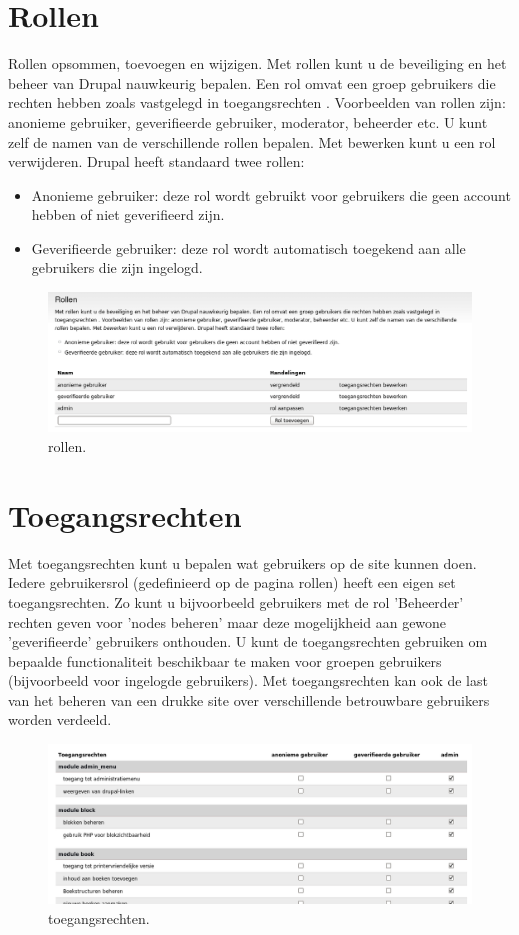     
\section{Rollen} 
    Rollen opsommen, toevoegen en wijzigen.
Met rollen kunt u de beveiliging en het beheer van Drupal nauwkeurig bepalen.
 Een rol omvat een groep gebruikers die rechten hebben zoals vastgelegd in toegangsrechten . 
 Voorbeelden van rollen zijn: anonieme gebruiker, geverifieerde gebruiker, moderator, beheerder etc. 
 U kunt zelf de namen van de verschillende rollen bepalen. Met bewerken kunt u een rol verwijderen. 
 Drupal heeft standaard twee rollen:
 \begin{itemize}
\item Anonieme gebruiker: deze rol wordt gebruikt voor gebruikers die geen
account hebben of niet geverifieerd zijn.
\item Geverifieerde gebruiker: deze rol wordt automatisch toegekend aan alle
gebruikers die zijn ingelogd.
\end{itemize}
\begin{figure}[!h]
    \centering
   \includegraphics[scale=0.3,angle=0]{rollen}
   \caption{rollen.\label{white}}
 \end{figure} 
 
    
\section{Toegangsrechten} 
Met toegangsrechten kunt u bepalen wat gebruikers op de site kunnen doen. Iedere
gebruikersrol (gedefinieerd op de pagina rollen) heeft een eigen set toegangsrechten. 
Zo kunt u bijvoorbeeld gebruikers met de rol 'Beheerder' rechten geven voor
'nodes beheren' maar deze mogelijkheid aan gewone 'geverifieerde' gebruikers
onthouden. U kunt de toegangsrechten gebruiken om bepaalde functionaliteit 
beschikbaar te maken voor groepen gebruikers (bijvoorbeeld voor ingelogde gebruikers). 
Met toegangsrechten kan ook de last van het beheren van een drukke site over 
verschillende betrouwbare gebruikers worden verdeeld.
\begin{figure}[!h]
    \centering
   \includegraphics[scale=0.3,angle=0]{toegangsrechten}
   \caption{toegangsrechten.\label{white}}
 \end{figure}


